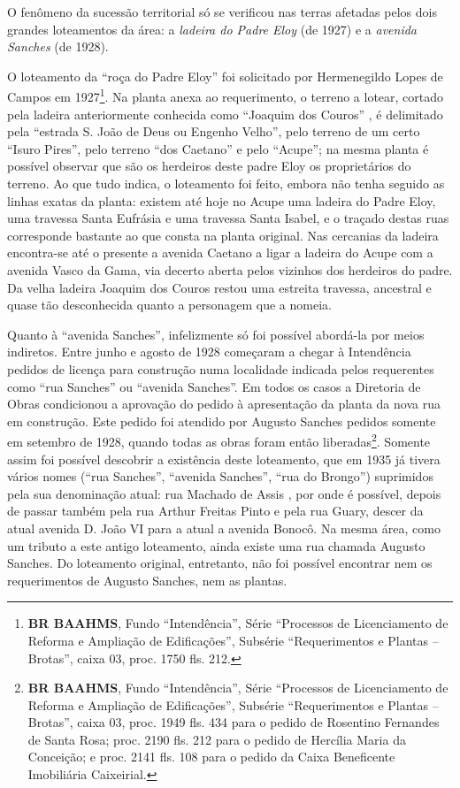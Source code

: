 
O fenômeno da sucessão territorial só se verificou nas terras afetadas pelos dois grandes loteamentos da área: a \textit{ladeira do Padre Eloy} (de 1927) e a \textit{avenida Sanches} (de 1928).

O loteamento da ``roça do Padre Eloy'' foi solicitado por Hermenegildo Lopes de Campos em 1927\footnote{\textbf{BR BAAHMS}, Fundo ``Intendência'', Série ``Processos de Licenciamento de Reforma e Ampliação de Edificações'', Subsérie ``Requerimentos e Plantas -- Brotas'', caixa 03, proc. 1750 fls. 212.}. Na planta anexa ao requerimento, o terreno a lotear, cortado pela ladeira anteriormente conhecida como ``Joaquim dos Couros'' \cite[p.~101]{souza_guia_1935}, é delimitado pela ``estrada S. João de Deus ou Engenho Velho'', pelo terreno de um certo ``Isuro Pires'', pelo terreno ``dos Caetano'' e pelo ``Acupe''; na mesma planta é possível observar que são os herdeiros deste padre Eloy os proprietários do terreno. Ao que tudo indica, o loteamento foi feito, embora não tenha seguido as linhas exatas da planta: existem até hoje no Acupe uma ladeira do Padre Eloy, uma travessa Santa Eufrásia e uma travessa Santa Isabel, e o traçado destas ruas corresponde bastante ao que consta na planta original. Nas cercanias da ladeira encontra-se até o presente a avenida Caetano a ligar a ladeira do Acupe com a avenida Vasco da Gama, via decerto aberta pelos vizinhos dos herdeiros do padre. Da velha ladeira Joaquim dos Couros restou uma estreita travessa, ancestral e quase tão desconhecida quanto a personagem que a nomeia. 

Quanto à ``avenida Sanches'', infelizmente só foi possível abordá-la por meios indiretos. Entre junho e agosto de 1928 começaram a chegar à Intendência pedidos de licença para construção numa localidade indicada pelos requerentes como ``rua Sanches'' ou ``avenida Sanches''. Em todos os casos a Diretoria de Obras condicionou a aprovação do pedido à apresentação da planta da nova rua em construção. Este pedido foi atendido por Augusto Sanches pedidos somente em setembro de 1928, quando todas as obras foram então liberadas\footnote{\textbf{BR BAAHMS}, Fundo ``Intendência'', Série ``Processos de Licenciamento de Reforma e Ampliação de Edificações'', Subsérie ``Requerimentos e Plantas -- Brotas'', caixa 03, proc. 1949 fls. 434 para o pedido de Rosentino Fernandes de Santa Rosa; proc. 2190 fls. 212 para o pedido de Hercília Maria da Conceição; e proc. 2141 fls. 108 para o pedido da Caixa Beneficente Imobiliária Caixeirial.}. Somente assim foi possível descobrir a existência deste loteamento, que em 1935 já tivera vários nomes (``rua Sanches'', ``avenida Sanches'', ``rua do Brongo'') suprimidos pela sua denominação atual: rua Machado de Assis \cite[p.~84]{souza_guia_1935}, por onde é possível, depois de passar também pela rua Arthur Freitas Pinto e pela rua Guary, descer da atual avenida D. João VI para a atual a avenida Bonocô. Na mesma área, como um tributo a este antigo loteamento, ainda existe uma rua chamada Augusto Sanches. Do loteamento original, entretanto, não foi possível encontrar nem os requerimentos de Augusto Sanches, nem as plantas.

